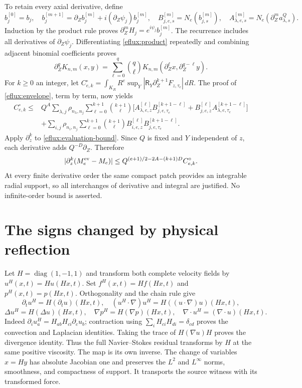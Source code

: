 To retain every axial derivative, define
\[
b_j^{[0]}=b_j,\quad
b_j^{[m+1]}=\partial_Zb_j^{[m]}+i(\partial_Z\psi_j)b_j^{[m]},
\quad B^{[m]}_{j,e,s}=N_e(b_{j,s}^{[m]}),\quad
A^{[m]}_{\lambda,e,s}=N_e(\partial_Z^ma^Q_{\lambda,s}).
\]
Induction by the product rule proves
$\partial_Z^mH_j=e^{i\psi_j}b_j^{[m]}$.
The recurrence includes all derivatives of $\partial_Z\psi_j$.
Differentiating \eqref{eflux:product} repeatedly and combining adjacent
binomial coefficients proves
\[
\partial_Z^qK_{n,m}(x,y)=
\sum_{\ell=0}^q\binom q\ell
K_{n,m}(\partial_Z^\ell x,\partial_Z^{q-\ell}y).
\]
For $k\ge0$ an integer, let
$C_{e,k}^\circ=\int_{K_R}R^e\sup_Y
|\mathsf R_Y\partial_Z^{k+1}F_{z,\tau_e}|\,dR$.
The proof of \eqref{eflux:envelope}, term by term, now yields
\begin{align}
C_{e,k}^\circ\le{}&
Q^A\sum_{\lambda,j}\rho_{n_\lambda,n_j}
\sum_{\ell=0}^{k+1}\binom{k+1}{\ell}
\bigl[A^{[\ell]}_{\lambda,e,z}B^{[k+1-\ell]}_{j,e,\tau_e}
+B^{[\ell]}_{j,e,z}A^{[k+1-\ell]}_{\lambda,e,\tau_e}\bigr]\nonumber\\
&+\sum_{i,j}\rho_{n_i,n_j}
\sum_{\ell=0}^{k+1}\binom{k+1}{\ell}
B^{[\ell]}_{i,e,z}B^{[k+1-\ell]}_{j,e,\tau_e}.
\label{eflux:higher-envelope}
\end{align}
Apply $\partial_z^k$ to \eqref{eflux:evaluation-bound}.
Since $Q$ is fixed and $Y$ independent of $z$, each derivative adds
$Q^{-D}\partial_Z$. Therefore
\begin{equation}
|\partial_z^k(M_e^{\rm ev}-M_e)|
\le Q^{(e+1)/2-2A-(k+1)D}C_{e,k}^\circ .
\label{eflux:higher}
\end{equation}
At every finite derivative order the same compact patch provides an
integrable radial support, so all interchanges of derivative and
integral are justified. No infinite-order bound is asserted.

\section{The signs changed by physical reflection}
\label{eflux:signs}
Let $H=\operatorname{diag}(1,-1,1)$ and transform both complete
velocity fields by $u^H(x,t)=Hu(Hx,t)$. Set
$f^H(x,t)=Hf(Hx,t)$ and $p^H(x,t)=p(Hx,t)$.
Orthogonality and the chain rule give
\[
\partial_tu^H=H(\partial_tu)(Hx,t),\quad
(u^H\cdot\nabla)u^H=H((u\cdot\nabla)u)(Hx,t),
\]
\[
\Delta u^H=H(\Delta u)(Hx,t),\quad
\nabla p^H=H(\nabla p)(Hx,t),\quad
\nabla\cdot u^H=(\nabla\cdot u)(Hx,t).
\]
Indeed $\partial_i u^H_a=H_{ab}H_{ci}\partial_cu_b$; contraction
using $\sum_iH_{ci}H_{di}=\delta_{cd}$ proves the convection and
Laplacian identities. Taking the trace of $H(\nabla u)H$ proves the
divergence identity. Thus the full Navier--Stokes residual transforms
by $H$ at the same positive viscosity. The map is its own inverse.
The change of variables $x=Hy$ has absolute Jacobian one and preserves
the $L^2$ and $L^\infty$ norms, smoothness, and compactness of support.
It transports the source witness with its transformed force.

